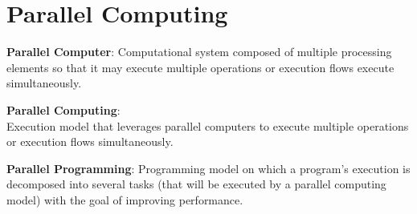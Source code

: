 \renewcommand{\image}[3]{\globimage{#1}{1}{#2}{#3}}
\renewcommand{\imagec}[4]{\globimagec{#1}{1}{#2}{#3}{#4}}
\renewcommand{\graphics}[2]{\texttt{[image: Images/Chapter 1/\#1]}}
\section{Parallel Computing}
\begin{minipage}{0.3\textwidth}
\centering
\par \textbf{Parallel Computer}: Computational system composed of multiple processing elements so that it may execute multiple operations or execution flows execute simultaneously.
\end{minipage}
\hfill\vrule\hfill
\begin{minipage}{0.3\textwidth}
\centering
\par \textbf{Parallel Computing}: \\Execution model that leverages parallel computers to execute multiple operations or execution flows simultaneously.
\end{minipage}
\hfill\vrule\hfill
\begin{minipage}{0.3\textwidth}
\vrule
\centering
\par \textbf{Parallel Programming}: Programming model on which a program’s execution is decomposed into several tasks (that will be executed by a parallel computing model) with the goal of improving performance.
\end{minipage}
